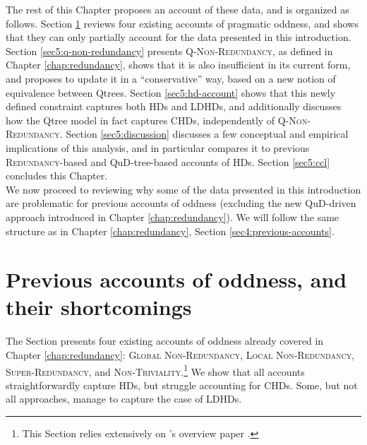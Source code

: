 \begin{exe}
	\ex \label{ex5:ldhd}
	\begin{xlist}
		\label{ex5:ldhd-sw}
		\label{ex5:ldhd-ws}
	\end{xlist}
\end{exe}


The rest of this Chapter proposes an account of these data, and is organized as follows. Section \ref{sec5:previous-accounts} reviews four existing accounts of pragmatic oddness, and shows that they can only partially account for the data presented in this introduction. Section \ref{sec5:q-non-redundancy} presents \textsc{Q-Non-Redundancy}, as defined in Chapter \ref{chap:redundancy}, shows that it is also insufficient in its current form, and proposes to update it in a ``conservative'' way, based on a new notion of equivalence between Qtrees. Section \ref{sec5:hd-account} shows that this newly defined constraint captures both HDs and LDHDs, and additionally discusses how the Qtree model in fact captures CHDs, independently of \textsc{Q-Non-Redundancy}. Section \ref{sec5:discussion} discusses a few conceptual and empirical implications of this analysis, and in particular compares it to previous \textsc{Redundancy}-based and QuD-tree-based accounts of HDs. Section \ref{sec5:ccl} concludes this Chapter.\\

We now proceed to reviewing why some of the data presented in this introduction are problematic for previous accounts of oddness (excluding the new QuD-driven approach introduced in Chapter \ref{chap:redundancy}). We will follow the same structure as in Chapter \ref{chap:redundancy}, Section \ref{sec4:previous-accounts}.

\section{Previous accounts of oddness, and their shortcomings}\label{sec5:previous-accounts}

The Section presents four existing accounts of oddness already covered in Chapter \ref{chap:redundancy}: \textsc{Global Non-Redundancy}, \textsc{Local Non-Redundancy}, \textsc{Super-Redundancy}, and \textsc{Non-Triviality}.\footnote{This Section relies extensively on \citeauthor{Marty2022}'s overview paper \citep{Marty2022}.} We show that all accounts straightforwardly capture HDs, but struggle accounting for CHDs. Some, but not all approaches, manage to capture the case of LDHDs.

